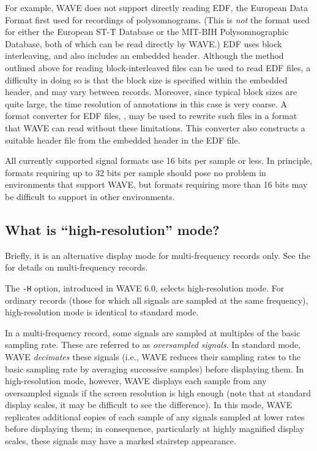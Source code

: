 \documentclass[twoside]{book}
\newcommand{\WAVE}{{\sf WAVE}\xspace}
\begin{document}
For example, \WAVE{} does not support directly reading EDF, the
European Data Format first used for recordings of
polysomnograms. (This is \emph{not} the format used for either the
European ST-T Database or the MIT-BIH Polysomnographic Database, both
of which can be read directly by \WAVE{}.)  EDF uses block
interleaving, and also includes an embedded header.  Although the
method outlined above for reading block-interleaved files can
be used to read EDF files, a difficulty in doing so is that the block
size is specified within the embedded header, and may vary between
records.  Moreover, since typical block sizes are quite large, the
time resolution of annotations in this case is very coarse.  A format
converter for EDF files,
, may be
used to rewrite such files in a format that \WAVE{} can read without
these limitations.  This converter also constructs a
suitable header file from the embedded header in the EDF file.

All currently supported signal formats use 16 bits per sample or less.
In principle, formats requiring up to 32 bits per sample should pose
no problem in environments that support \WAVE{}, but formats requiring
more than 16 bits may be difficult to support in other environments.

\subsection{What is ``high-resolution'' mode?}

\label{faq:high-res}
Briefly, it is an alternative display mode for multi-frequency records
only.  See the
for details on multi-frequency records.

\index{H option for WAVE@{\tt -H} option for \WAVE{}}
The {\tt -H} option, introduced in \WAVE{} 6.0, selects
high-resolution mode.  For ordinary records (those for which all
signals are sampled at the same frequency), high-resolution mode is
identical to standard mode.

In a multi-frequency record, some signals are sampled at multiples of
the basic sampling rate.  These are referred to as \emph{oversampled
signals}.  In standard mode, \WAVE{} \emph{decimates} these signals
(i.e., \WAVE{} reduces their sampling rates to the basic sampling rate
by averaging successive samples) before displaying them.  In
high-resolution mode, however, \WAVE{} displays each sample from any
oversampled signals if the screen resolution is high enough (note that
at standard display scales, it may be difficult to see the
difference).  In this mode, \WAVE{} replicates additional copies of
each sample of any signals sampled at lower rates before displaying
them; in consequence, particularly at highly magnified display scales,
these signals may have a marked stairstep appearance.
\end{document}
